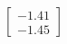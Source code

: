 \documentclass[preview]{standalone}
\begin{document}
\begin{align*}
\begin{bmatrix} -1.41 \\ -1.45 \end{bmatrix}
\end{align*}
\end{document}

